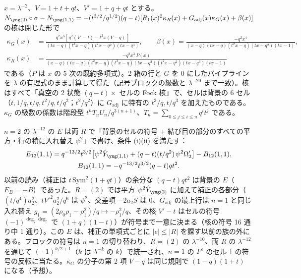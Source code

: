 \begin{compresult}[随伴のタワーの母関数]\label{cr:tower}
$x = \lambda^{-2}$、$V = 1+t+qt$、$V' = 1+q+qt$ とする。$N_{\ytwo}\circ\sigma - N_{\yoneone} = -(t^{3/2}/q^{1/2})(q-t)[R_1(x)^2\kappa_R(x) + G_{\mathrm{adj}}(x)\kappa_G(x) + \beta(x)]$ の核は閉じた形で
\begingroup\small
\begin{align*}
\kappa_G(x) &= \frac{q^2x^3[\,q^2(V'-t) - t^2x(V-q)\,]}{(tx-q)(t^3x-q)(t^2x-q^2)(tx-q^3)},\qquad
\beta(x) = \frac{-q^2x^4}{(x-q)(tx-q)(t^2x-q)(tx-q^2)(tx-1)},\\
\kappa_R(x) &= \frac{-q^2x^3\,P(x)}{(x-q)(tx-q)(t^2x-q)(t^3x-q)(tx-q^2)(t^2x-q^2)(tx-q^3)(tx-1)}
\end{align*}
\endgroup
である（$P$ は $x$ の 5 次の既約多項式）。2 箱の行と $G$ を 0 にしたパイプラインを $\lambda$ の有理式のまま計算して得た（記号ブロックの級数と $\lambda^{-20}$ まで一致）。核はすべて「真空の 2 状態 $(q-t)\times$ セルの Fock 核」で、セルは背景の 6 セル（$t, 1/q, t/q, t^2/q, t/q^2$；$t^2/q^2$）に $G_{\mathrm{adj}}$ に特有の $t^3/q, t/q^3$ を加えたものである。$\kappa_G$ の級数の係数は階段型 $t^nT_nU_n/q^{3(n+1)}$、$T_n = \sum_{0\le j\le i\le n}q^it^j$ である。
\end{compresult}
\begin{compresult}[$n = 2$ の $\lambda^{-12}$ の $E$：全部入れ替え]\label{cr:n2E}
$n = 2$ の $\lambda^{-12}$ の $E$ は両 $R$ で「背景のセルの符号 $+$ 結び目の部分のすべての平方・行の積に入れ替え $\psi^2$」で書け、条件 (i)(ii) を満たす：
\begin{gather*}
E_{12}(1,1) = q^{-13/2}t^{3/2}\bigl[\psi^2\hat Y_{\yoneone} + (q-t)(t/q^2)\,\psi^2\Omega'_2\bigr] - B_{12}(1,1),\\
B_{12}(1,1) = -q^{-13/2}t^{3/2}(q-t)qt^2 .
\end{gather*}
以前の読み（補正は $t\,\mathrm{Sym}^2(1+qt)$）の余分な $(q-t)qt^2$ は背景の $E$（$E_B = -B$）であった。$R = (2)$ では平方 $\psi^2\hat Y_{\ytwo}$ に加えて補正の各部分（$(t/q^4)a_2^2$、$tV'^2a_2^2/q^6$ は $\psi^2$、交差項 $-2a_2\tilde S$ は 0、$G_{\mathrm{adj}}$ の最上行は $n = 1$ と同じ入れ替え $g_1 = (2\rho_0\rho_1 - \rho_1^2)/q \mapsto -\rho_1^2/q$、その核 $V' - t$ はセルの符号 $(-1)^{\deg_q\deg_t}$ で $(1+q)(1-t)$）が符号まで一意に決まる（核の符号 16 通り中 1 通り）。この $E$ は、補正の単項式ごとに $|e|\le|R|$ を課す以前の族の外にある。ブロックの符号は $n = 1$ の切り替わり、$R = (2)$ の $\lambda^{-10}$、両 $R$ の $\lambda^{-12}$ を通じて $(-1)^{k/2+1}$（$k$ は $\lambda^{-k}$ の $k$）で統一され、$n = 1$ の $F^\varepsilon$ のセル 1 の符号の反転に当たる。$\kappa_G$ の分子の第 2 項 $V - q$ は同じ規則で $(1-q)(1+t)$ になる（予想）。
\end{compresult}
